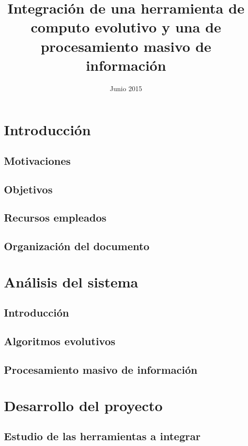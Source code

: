 \documentclass{estilos-y-libreria}
\title{Integración de una herramienta de computo evolutivo y una de procesamiento masivo de informaci\'on}
\date{Junio 2015}
\begin{document}
\frontmatter
\hacerportada
\hacercontraportada
\newpage{\ }
\thispagestyle{empty} 
\hacerprologo
\haceragradecimientos
\setcounter{secnumdepth}{2}
\setcounter{tocdepth}{2}
\tableofcontents
\listoffigures
\listoftables

\mainmatter

\chapter{Introducci\'on}
	\section{Motivaciones}
		
	\section{Objetivos}
	\section{Recursos empleados}
	\section{Organizaci\'on del documento}

\chapter{An\'alisis del sistema}
	\section{Introducci\'on}
	\section{Algoritmos evolutivos}
		
	\section{Procesamiento masivo de informaci\'on}
		

\chapter{Desarrollo del proyecto}
	\section{Estudio de las herramientas a integrar}
\end{document}
